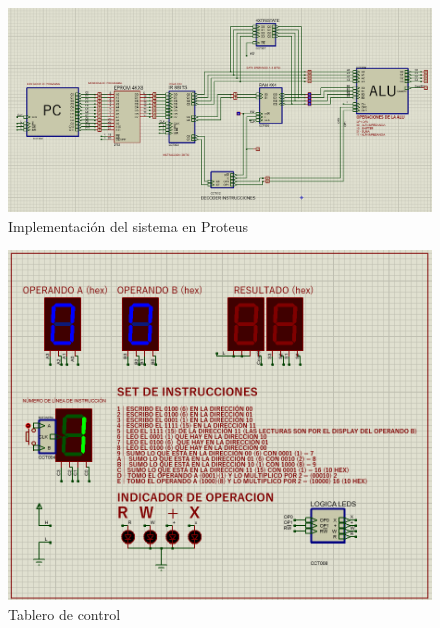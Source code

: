 \documentclass{sciposter}
\begin{document}
\begin{figure}[H]
    \centering
    \includegraphics[width=1\linewidth]{Implementacion en proteus.png}
    \caption{Implementación del sistema en Proteus}
    \label{fig:implementacion}
\end{figure}

\begin{figure}[H]
    \centering
    \includegraphics[width=0.7\linewidth]{Tablero de control.png}
    \caption{Tablero de control}
    \label{fig:tabcontrol}
\end{figure}
\end{document}
